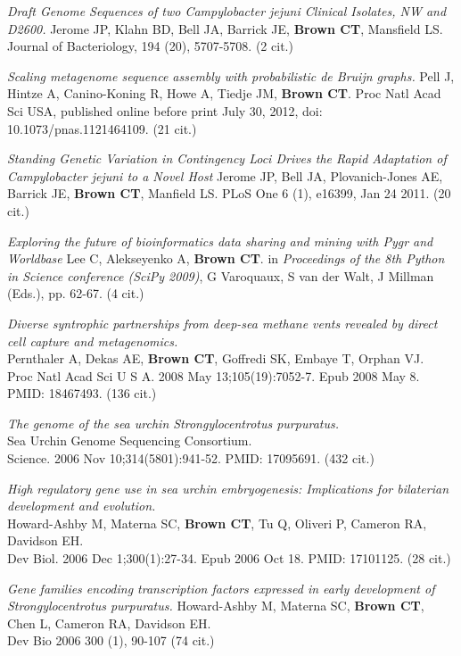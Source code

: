 \documentclass[margin,line]{resume}
\begin{document}
\begin{resume}
{\em Draft Genome Sequences of two Campylobacter jejuni Clinical Isolates,
NW and D2600.} Jerome JP, Klahn BD, Bell JA, Barrick JE, {\bf Brown CT}, Mansfield LS. Journal of Bacteriology, 194 (20), 5707-5708. (2 cit.)

{\em Scaling metagenome sequence assembly with probabilistic de Bruijn
graphs.} Pell J, Hintze A, Canino-Koning R, Howe A, Tiedje JM, {\bf Brown
  CT}. Proc Natl Acad Sci USA, published online before print July 30,
  2012, doi: 10.1073/pnas.1121464109. (21 cit.)

{\em Standing Genetic Variation in Contingency Loci Drives the Rapid
  Adaptation of Campylobacter jejuni to a Novel Host} Jerome JP, Bell
JA, Plovanich-Jones AE, Barrick JE, {\bf Brown CT}, Manfield LS.  PLoS One 6
(1), e16399, Jan 24 2011. (20 cit.)

{\em Exploring the future of bioinformatics data sharing and mining
  with Pygr and Worldbase} Lee C, Alekseyenko A, {\bf Brown CT}.  in {\em
  Proceedings of the 8th Python in Science conference (SciPy 2009)}, G
Varoquaux, S van der Walt, J Millman (Eds.), pp. 62-67.  (4 cit.)

{\em Diverse syntrophic partnerships from deep-sea methane vents revealed by direct cell capture and metagenomics.}\\
Pernthaler A, Dekas AE, {\bf Brown CT}, Goffredi SK, Embaye T, Orphan VJ.\\
Proc Natl Acad Sci U S A. 2008 May
13;105(19):7052-7. Epub 2008 May 8.  PMID: 18467493.  (136 cit.)

\newpage

{\em The genome of the sea urchin Strongylocentrotus purpuratus.}\\
Sea Urchin Genome Sequencing Consortium.\\
Science. 2006 Nov 10;314(5801):941-52.
PMID: 17095691.  (432 cit.)

{\em High regulatory gene use in sea urchin embryogenesis: Implications for bilaterian development and evolution.}\\
Howard-Ashby M, Materna SC, {\bf Brown CT}, Tu Q, Oliveri P, Cameron RA, Davidson EH.\\
Dev Biol. 2006 Dec 1;300(1):27-34. Epub 2006 Oct 18.
PMID: 17101125.  (28 cit.)

{\em Gene families encoding transcription factors expressed in early development of Strongylocentrotus purpuratus.}
Howard-Ashby M, Materna SC, {\bf Brown CT}, Chen L, Cameron RA, Davidson EH.\\
Dev Bio 2006 300 (1), 90-107 (74 cit.)


\end{resume}
\end{document}

